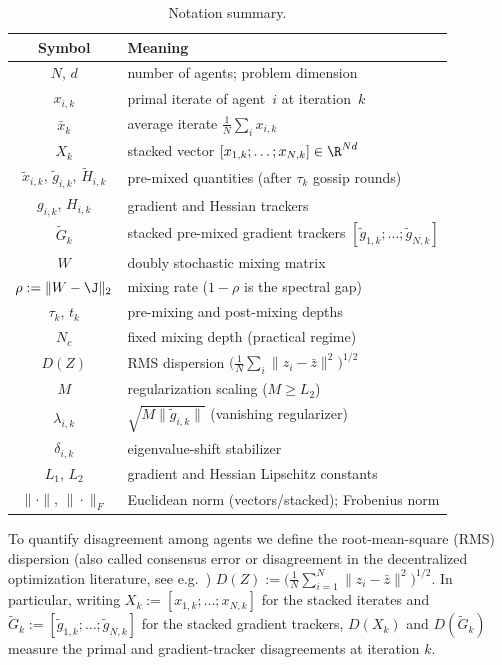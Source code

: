 \documentclass[review,onefignum,onetabnum]{siamart171218}
\begin{document}
	\begin{table}[htbp]
		\centering
		\caption{Notation summary.}
		\label{tab:notation}
		\setlength{\tabcolsep}{4pt}
		\small
		\begin{tabular}{cl}
			\toprule
			Symbol & Meaning \\
			\midrule
			$N$, $d$ & number of agents; problem dimension \\
			$x_{i,k}$ & primal iterate of agent~$i$ at iteration~$k$ \\
			$\bar x_k$ & average iterate $\frac1N\sum_i x_{i,k}$ \\
			$X_k$ & stacked vector $[x_{1,k};\dots;x_{N,k}]\in\R^{Nd}$ \\
			$\tilde x_{i,k}$, $\tilde g_{i,k}$, $\tilde H_{i,k}$ & pre-mixed quantities (after $\tau_k$ gossip rounds) \\
			$g_{i,k}$, $H_{i,k}$ & gradient and Hessian trackers \\
			$\tilde G_k$ & stacked pre-mixed gradient trackers $[\tilde g_{1,k};\dots;\tilde g_{N,k}]$ \\
			$W$ & doubly stochastic mixing matrix \\
			$\rho:=\|W-\J\|_2$ & mixing rate ($1{-}\rho$ is the spectral gap) \\
			$\tau_k$, $t_k$ & pre-mixing and post-mixing depths \\
			$N_c$ & fixed mixing depth (practical regime) \\
			$D(Z)$ & RMS dispersion $\bigl(\frac1N\sum_i\|z_i-\bar z\|^2\bigr)^{1/2}$ \\
			$M$ & regularization scaling ($M\ge L_2$) \\
			$\lambda_{i,k}$ & $\sqrt{M\|\tilde g_{i,k}\|}$ (vanishing regularizer) \\
			$\delta_{i,k}$ & eigenvalue-shift stabilizer \\
			$L_1$, $L_2$ & gradient and Hessian Lipschitz constants \\
			$\|\cdot\|$, $\|\cdot\|_F$ & Euclidean norm (vectors/stacked); Frobenius norm \\
			\bottomrule
		\end{tabular}
	\end{table}
	
	To quantify disagreement among agents we define the root-mean-square (RMS) dispersion
	(also called consensus error or disagreement in the
	decentralized optimization literature, see e.g.\
	\citet{nedic2009subgradient,nedic2017diging})
	\(
	D(Z):=\bigl(\tfrac1N\sum_{i=1}^N\|z_i-\bar z\|^2\bigr)^{1/2}.
	\)
	In particular, writing $X_k:=[x_{1,k};\dots;x_{N,k}]$ for the stacked iterates and
	$\tilde G_k:=[\tilde g_{1,k};\dots;\tilde g_{N,k}]$ for the stacked gradient trackers,
	$D(X_k)$ and $D(\tilde G_k)$ measure the primal and gradient-tracker disagreements at iteration $k$.
	
\end{document}
